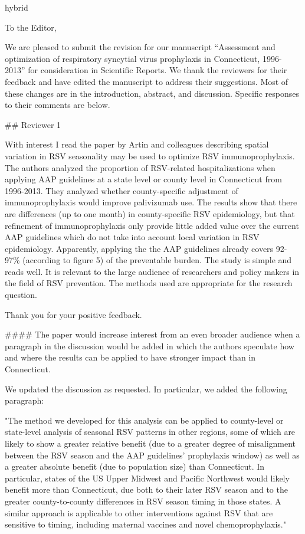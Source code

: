 \documentclass{article}
\begin{document}
\begin{markdown*}{hybrid}

To the Editor,

We are pleased to submit the revision for our manuscript “Assessment and optimization of respiratory syncytial virus prophylaxis in Connecticut, 1996-2013” for consideration in Scientific Reports. We thank the reviewers for their feedback and have edited the manuscript to address their suggestions. Most of these changes are in the introduction, abstract, and discussion. Specific responses to their comments are below.

## Reviewer 1

\begin{displayquote}
With interest I read the paper by Artin and colleagues describing spatial variation in RSV seasonality may be used to optimize RSV immunoprophylaxis. The authors analyzed the proportion of RSV-related hospitalizations when applying AAP guidelines at a state level or  county level in Connecticut from 1996-2013. They analyzed whether county-specific adjustment of immunoprophylaxis would improve palivizumab use. The results show that there are differences (up to one month) in county-specific RSV epidemiology, but that refinement of immunoprophylaxis only provide little added value over the current AAP guidelines which do not take into account local variation in RSV epidemiology. Apparently, applying the the AAP guidelines already covers 92-97\% (according to figure 5) of the preventable burden. The study is simple and reads well. It is relevant to the large audience of researchers and policy makers in the field of RSV prevention. The methods used are appropriate for the research question.
\end{displayquote}

Thank you for your positive feedback. 

#### The paper would increase interest from an even broader audience when a paragraph in the discussion would be added in which the authors speculate how and where the results can be applied to have stronger impact than in Connecticut.

We updated the discussion as requested. In particular, we added the following paragraph:

"The method we developed for this analysis can be applied to county-level or state-level analysis of seasonal RSV patterns in other regions, some of which are likely to show a greater relative benefit (due to a greater degree of misalignment between the RSV season and the AAP guidelines' prophylaxis window) as well as a greater absolute benefit (due to population size) than Connecticut. In particular, states of the US Upper Midwest and Pacific Northwest would likely benefit more than Connecticut, due both to their later RSV season and to the greater county-to-county differences in RSV season timing in those states.\cite{Weinberger:2015hj} A similar approach is applicable to other interventions against RSV that are sensitive to timing, including maternal vaccines and novel chemoprophylaxis."


\end{markdown*}
\end{document}
